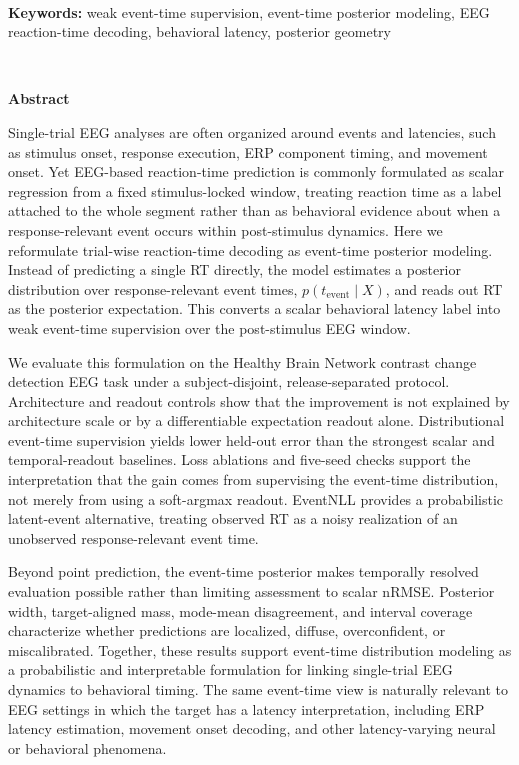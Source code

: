 \documentclass[12pt]{article}
\begin{document}
\ \\[-2mm]
{\bf Keywords:} weak event-time supervision, event-time posterior modeling, EEG reaction-time decoding, behavioral latency, posterior geometry

\thispagestyle{empty}
%
\ \vspace{-0mm}\\
%
\begin{center} {\bf Abstract} \end{center}



Single-trial EEG analyses are often organized around events and latencies, such as stimulus onset, response execution, ERP component timing, and movement onset. Yet EEG-based reaction-time prediction is commonly formulated as scalar regression from a fixed stimulus-locked window, treating reaction time as a label attached to the whole segment rather than as behavioral evidence about when a response-relevant event occurs within post-stimulus dynamics. Here we reformulate trial-wise reaction-time decoding as event-time posterior modeling. Instead of predicting a single RT directly, the model estimates a posterior distribution over response-relevant event times, \(p(t_{\mathrm{event}} \mid X)\), and reads out RT as the posterior expectation. This converts a scalar behavioral latency label into weak event-time supervision over the post-stimulus EEG window.

We evaluate this formulation on the Healthy Brain Network contrast change detection EEG task under a subject-disjoint, release-separated protocol. Architecture and readout controls show that the improvement is not explained by architecture scale or by a differentiable expectation readout alone. Distributional event-time supervision yields lower held-out error than the strongest scalar and temporal-readout baselines. Loss ablations and five-seed checks support the interpretation that the gain comes from supervising the event-time distribution, not merely from using a soft-argmax readout. EventNLL provides a probabilistic latent-event alternative, treating observed RT as a noisy realization of an unobserved response-relevant event time.

Beyond point prediction, the event-time posterior makes temporally resolved evaluation possible rather than limiting assessment to scalar nRMSE. Posterior width, target-aligned mass, mode-mean disagreement, and interval coverage characterize whether predictions are localized, diffuse, overconfident, or miscalibrated. Together, these results support event-time distribution modeling as a probabilistic and interpretable formulation for linking single-trial EEG dynamics to behavioral timing. The same event-time view is naturally relevant to EEG settings in which the target has a latency interpretation, including ERP latency estimation, movement onset decoding, and other latency-varying neural or behavioral phenomena.
\end{document}
